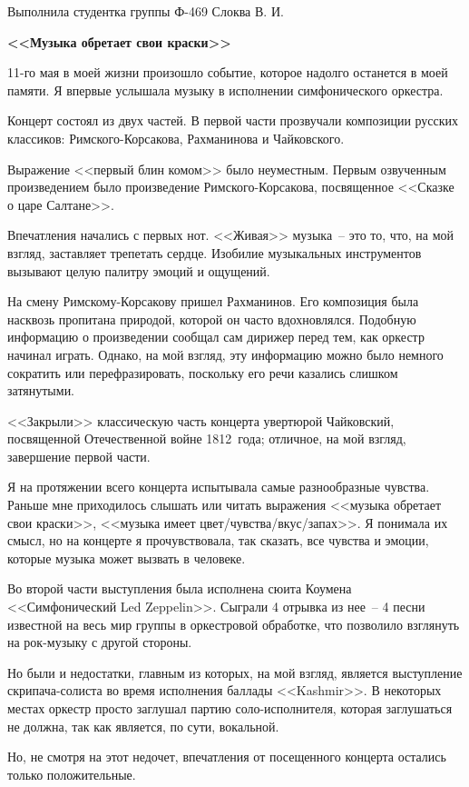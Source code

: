 \documentclass[12pt,pscyr]{hedwork}
\begin{document}
  \begin{flushright}
    Выполнила студентка группы Ф-469 Слоква В. И.
  \end{flushright}
  \vspace{-2em}
  \begin{center}
    \bfseries <<Музыка обретает свои краски>>
  \end{center}

  11-го мая в моей жизни произошло событие, которое надолго останется в моей
  памяти. Я впервые услышала музыку в исполнении симфонического оркестра.

  Концерт состоял из двух частей. В первой части прозвучали композиции русских
  классиков: Римского-Корсакова, Рахманинова и Чайковского.

  Выражение <<первый блин комом>> было неуместным. Первым озвученным
  произведением было произведение Римского-Корсакова, посвященное <<Сказке о
  царе Салтане>>.

  Впечатления начались с первых нот. <<Живая>> музыка~-- это то, что, на мой
  взгляд, заставляет трепетать сердце. Изобилие музыкальных инструментов
  вызывают целую палитру эмоций и ощущений.

  На смену Римскому-Корсакову пришел Рахманинов. Его композиция была насквозь
  пропитана природой, которой он часто вдохновлялся. Подобную информацию о
  произведении сообщал сам дирижер перед тем, как оркестр начинал играть.
  Однако, на мой взгляд, эту информацию можно было немного сократить или
  перефразировать, поскольку его речи казались слишком затянутыми.

  <<Закрыли>> классическую часть концерта увертюрой Чайковский, посвященной
  Отечественной войне 1812~года; отличное, на мой взгляд, завершение первой
  части.

  Я на протяжении всего концерта испытывала самые разнообразные чувства. Раньше
  мне приходилось слышать или читать выражения <<музыка обретает свои краски>>,
  <<музыка имеет цвет/чувства/вкус/запах>>. Я понимала их смысл, но на концерте
  я прочувствовала, так сказать, все чувства и эмоции, которые музыка может
  вызвать в человеке.

  Во второй части выступления была исполнена сюита Коумена <<Симфонический Led
  Zeppelin>>. Сыграли 4 отрывка из нее~-- 4 песни известной на весь мир группы
  в оркестровой обработке, что позволило взглянуть на рок-музыку с другой
  стороны.

  Но были и недостатки, главным из которых, на мой взгляд, является выступление
  скрипача-солиста во время исполнения баллады <<Kashmir>>. В некоторых местах
  оркестр просто заглушал партию соло-исполнителя, которая заглушаться не
  должна, так как является, по сути, вокальной.

  Но, не смотря на этот недочет, впечатления от посещенного концерта остались
  только положительные.
\end{document}
